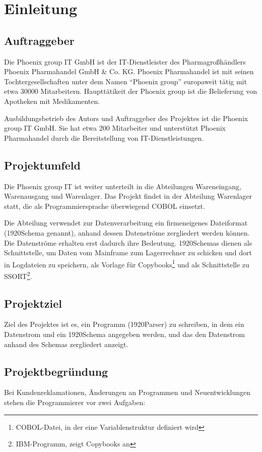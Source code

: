 \section{Einleitung}
\label{sec:Einleitung}
\subsection{Auftraggeber}
\label{sec:Auftraggeber}
Die Phoenix group IT GmbH ist der IT-Dienstleister des Pharmagroßhändlers Phoenix Pharmahandel GmbH \& Co. KG. Phoenix Pharmahandel ist mit seinen Tochtergesellschaften unter dem Namen ``Phoenix group'' europaweit tätig mit etwa 30000 Mitarbeitern. Haupttätikeit der Phoenix group ist die Belieferung von Apotheken mit Medikamenten.

Ausbildungsbetrieb des Autors und Auftraggeber des Projektes ist die Phoenix group IT GmbH. Sie hat etwa 200 Mitarbeiter und unterstützt Phoenix Pharmahandel durch die Bereitstellung von IT-Dienstleistungen.

\subsection{Projektumfeld} 
\label{sec:Projektumfeld}
Die Phoenix group IT ist weiter unterteilt in die Abteilungen Wareneingang, Warenausgang und Warenlager. Das Projekt findet in der Abteilung Warenlager statt, die als Programmiersprache überwiegend \ac{COBOL} einsetzt.


Die Abteilung verwendet zur Datenverarbeitung ein firmeneigenes Dateiformat (1920Schema genannt), anhand dessen Datenströme zergliedert werden können. Die Datenströme erhalten erst dadurch ihre Bedeutung. 1920Schemas dienen als Schnittstelle, um Daten vom Mainframe zum Lagerrechner zu schicken und dort in Logdateien zu speichern, als Vorlage für Copybooks\footnote{COBOL-Datei, in der eine Variablenstruktur definiert wird} und als Schnittstelle zu SSORT\footnote{IBM-Programm, zeigt Copybooks an}.

\subsection{Projektziel} 
\label{sec:Projektziel}
Ziel des Projektes ist es, ein Programm (1920Parser) zu schreiben, in dem ein Datenstrom und ein 1920Schema angegeben werden, und das den Datenstrom anhand des Schemas zergliedert anzeigt.


\subsection{Projektbegründung}
\label{sec:Projektbegruendung}
Bei Kundenreklamationen, Änderungen an Programmen und Neuentwicklungen stehen die
Programmierer vor zwei Aufgaben:

